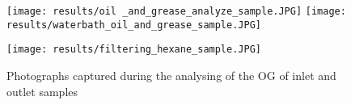 \begin{figure}[H]
\centering

\texttt{[image: results/oil \_and\_grease\_analyze\_sample.JPG]}\hfill
\texttt{[image: results/waterbath\_oil\_and\_grease\_sample.JPG]}\hfill

\vspace{3mm}

\texttt{[image: results/filtering\_hexane\_sample.JPG]}\hfill


\caption{Photographs captured during the analysing of the \ac{OG} of inlet and outlet samples}
\label{fig: oil_and_grease_analyze_samples}
\end{figure}